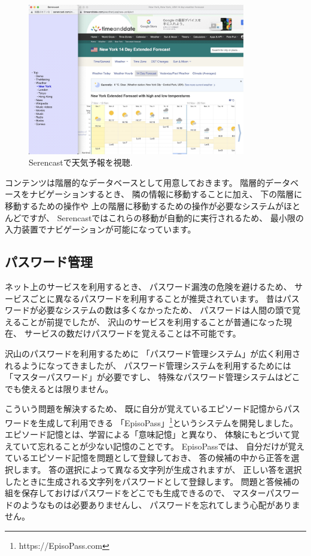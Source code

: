 \documentclass[topics]{compsoft} %
\begin{document}
\begin{figure}[t]
  \includegraphics[width=9.5cm,bb=0 0 2510 1746]{figures/bb4027e2e210bc16450f0120a2987458.jpg}
  \caption{Serencastで天気予報を視聴.}
  \label{serencast}
\end{figure}

コンテンツは階層的なデータベースとして用意しておきます。
階層的データベースをナビゲーションするとき、
隣の情報に移動することに加え、
下の階層に移動するための操作や
上の階層に移動するための操作が必要なシステムがほとんどですが、
Serencastではこれらの移動が自動的に実行されるため、
最小限の入力装置でナビゲーションが可能になっています。

\subsection{パスワード管理}

ネット上のサービスを利用するとき、
パスワード漏洩の危険を避けるため、
サービスごとに異なるパスワードを利用することが推奨されています。
%
昔はパスワードが必要なシステムの数は多くなかったため、
パスワードは人間の頭で覚えることが前提でしたが、
沢山のサービスを利用することが普通になった現在、
サービスの数だけパスワードを覚えることは不可能です。

沢山のパスワードを利用するために
「パスワード管理システム」が広く利用されるようになってきましたが、
パスワード管理システムを利用するためには「マスターパスワード」が必要ですし、
特殊なパスワード管理システムはどこでも使えるとは限りません。

こういう問題を解決するため、
既に自分が覚えているエピソード記憶からパスワードを生成して利用できる
「EpisoPass」\footnote{
  \textsf{https:{\slash}{\slash}EpisoPass.com}
}というシステムを開発しました\cite{episopass2}\cite{episopass1}。
エピソード記憶とは、学習による「意味記憶」と異なり、
体験にもとづいて覚えていて忘れることが少ない記憶のことです。
EpisoPassでは、
自分だけが覚えているエピソード記憶を問題として登録しておき、
答の候補の中から正答を選択します。
答の選択によって異なる文字列が生成されますが、
正しい答を選択したときに生成される文字列をパスワードとして登録します。
問題と答候補の組を保存しておけばパスワードをどこでも生成できるので、
マスターパスワードのようなものは必要ありませんし、
パスワードを忘れてしまう心配がありません。
\end{document}
